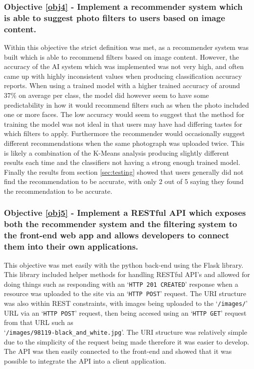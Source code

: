 \documentclass[a4paper,12pt]{report}
\begin{document}
  \subsubsection{Objective \ref{obj4} - Implement a recommender system which is able to suggest photo filters to users based on image content.}
    Within this objective the strict definition was met, as a recommender system was built which is able to recommend filters based on image content. However, the accuracy of the AI system which was implemented was not very high, and often came up with highly inconsistent values when producing classification accuracy reports. When using a trained model with a higher trained accuracy of around 37\% on average per class, the model did however seem to have some predictability in how it would recommend filters such as when the photo included one or more faces. The low accuracy would seem to suggest that the method for training the model was not ideal in that users may have had differing tastes for which filters to apply. Furthermore the recommender would occasionally suggest different recommendations when the same photograph was uploaded twice. This is likely a combination of the K-Means analysis producing slightly different results each time and the classifiers not having a strong enough trained model. Finally the results from section \ref{sec:testing} showed that users generally did not find the recommendation to be accurate, with only 2 out of 5 saying they found the recommendation to be accurate.

  \subsubsection{Objective \ref{obj5} - Implement a RESTful API which exposes both the recommender system and the filtering system to the front-end web app and allows developers to connect them into their own applications.}
    This objective was met easily with the python back-end using the Flask library. This library included helper methods for handling RESTful API's and allowed for doing things such as responding with an ‘\texttt{HTTP 201 CREATED}’ response when a resource was uploaded to the site via an ‘\texttt{HTTP POST}’ request. The URI structure was also within REST constraints, with images being uploaded to the ‘\texttt{/images/}’ URL via an ‘\texttt{HTTP POST}’ request, then being accesed using an ‘\texttt{HTTP GET}’ request from that URL such as\\ ‘\texttt{/images/98119-black\_and\_white.jpg}’. The URI structure was relatively simple due to the simplicity of the request being made therefore it was easier to develop. The API was then easily connected to the front-end and showed that it was possible to integrate the API into a client application.
\end{document}
